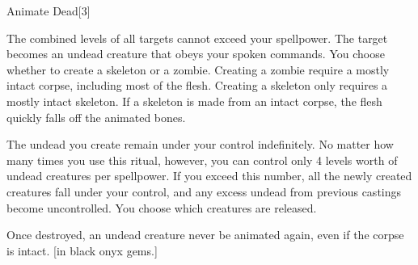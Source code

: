 \begin{spellsection}{Animate Dead}[3]
    \begin{spellheader}
    \end{spellheader}
    \begin{spellcontent}
        \begin{spelltargetinginfo}
        \end{spelltargetinginfo}
        \begin{spelleffects}

            \spellspecial The combined levels of all targets cannot exceed your spellpower.
            \spelleffect The target becomes an undead creature that obeys your spoken commands. You choose whether to create a skeleton or a zombie. Creating a zombie require a mostly intact corpse, including most of the flesh. Creating a skeleton only requires a mostly intact skeleton. If a skeleton is made from an intact corpse, the flesh quickly falls off the animated bones.
        \end{spelleffects}
    \end{spellcontent}
    \begin{spellfooter}
        \spellnotes The undead you create remain under your control indefinitely. No matter how many times you use this ritual, however, you can control only 4 levels worth of undead creatures per spellpower. If you exceed this number, all the newly created creatures fall under your control, and any excess undead from previous castings become uncontrolled. You choose which creatures are released.

        Once destroyed, an undead creature never be animated again, even if the corpse is intact.
        [in black onyx gems.]
    \end{spellfooter}
\end{spellsection}

